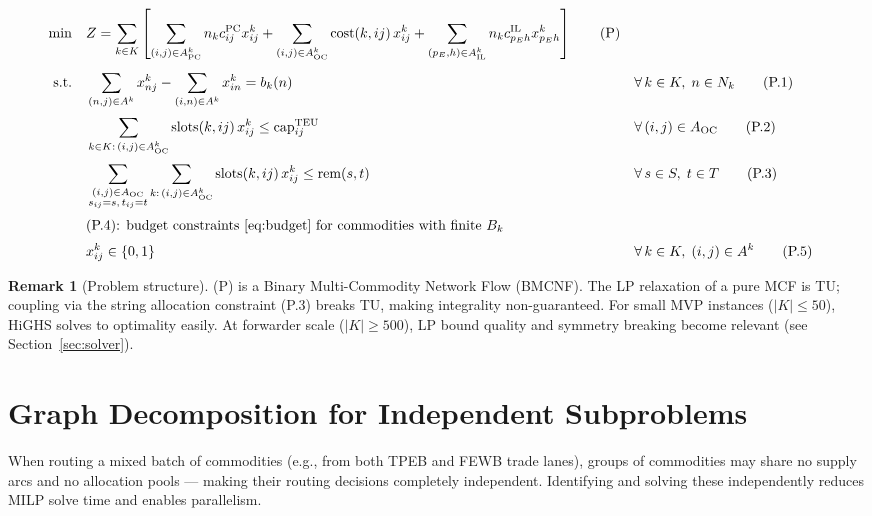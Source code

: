 \documentclass[11pt,a4paper]{article}
\theoremstyle{definition}
\newtheorem{remark}{Remark}
\begin{document}
\begin{align}
  \min \quad & Z = \sum_{k \in K} \left[
    \sum_{(i,j) \in A^k_{\text{PC}}} n_k c_{ij}^{\text{PC}} x_{ij}^k
    + \sum_{(i,j) \in A^k_{\text{OC}}} \text{cost}(k,ij)\, x_{ij}^k
    + \sum_{(p_E,h) \in A^k_{\text{IL}}} n_k c_{p_E h}^{\text{IL}} x_{p_E h}^k
  \right] \tag{P} \label{eq:P} \\[4pt]
  \text{s.t.} \quad
  & \sum_{(n,j) \in A^k} x_{nj}^k - \sum_{(i,n) \in A^k} x_{in}^k = b_k(n)
    && \forall\, k \in K,\; n \in N_k \tag{P.1} \\[2pt]
  & \sum_{k \in K:\, (i,j) \in A^k_{\text{OC}}} \text{slots}(k,ij)\, x_{ij}^k
      \leq \text{cap}_{ij}^{\text{TEU}}
    && \forall\, (i,j) \in A_{\text{OC}} \tag{P.2} \\[2pt]
  & \sum_{\substack{(i,j) \in A_{\text{OC}} \\ s_{ij}=s,\, t_{ij}=t}} \sum_{k:\, (i,j) \in A^k_{\text{OC}}} \text{slots}(k,ij)\, x_{ij}^k
      \leq \text{rem}(s,t)
    && \forall\, s \in S,\; t \in T \tag{P.3} \\[2pt]
  & \text{(P.4): budget constraints \eqref{eq:budget} for commodities with finite } B_k \notag \\[2pt]
  & x_{ij}^k \in \{0,1\}
    && \forall\, k \in K,\; (i,j) \in A^k \tag{P.5}
\end{align}

\begin{remark}[Problem structure]
(P) is a Binary Multi-Commodity Network Flow (BMCNF). The LP relaxation of a pure MCF is
TU; coupling via the string allocation constraint (P.3) breaks TU, making
integrality non-guaranteed. For small MVP instances ($|K| \leq 50$), HiGHS solves to
optimality easily. At forwarder scale ($|K| \geq 500$), LP bound quality and symmetry
breaking become relevant (see Section~\ref{sec:solver}).
\end{remark}

\section{Graph Decomposition for Independent Subproblems}
\label{sec:decomp}

When routing a mixed batch of commodities (e.g., from both TPEB and FEWB trade lanes),
groups of commodities may share no supply arcs and no allocation pools — making their
routing decisions completely independent. Identifying and solving these independently
reduces MILP solve time and enables parallelism.
\end{document}
